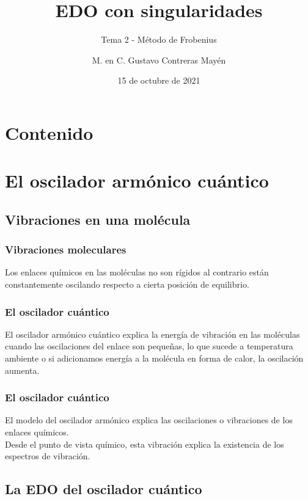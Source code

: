 \documentclass[12pt]{beamer}
\date{15 de octubre de 2021}
\title{\large{EDO con singularidades}}
\subtitle{Tema 2 - Método de Frobenius}
\author{M. en C. Gustavo Contreras Mayén}
\begin{document}
\maketitle
\fontsize{14}{14}\selectfont
{}

\section*{Contenido}

\section{El oscilador armónico cuántico}
\subsection{Vibraciones en una molécula}

\begin{frame}
\frametitle{Vibraciones moleculares}
Los enlaces químicos en las moléculas no son rígidos al contrario están constantemente oscilando respecto a cierta posición de equilibrio.
\end{frame}
\begin{frame}
\frametitle{El oscilador cuántico}
El oscilador armónico cuántico explica la energía de vibración en las moléculas cuando las oscilaciones del enlace son pequeñas, lo que sucede a temperatura ambiente o si adicionamos energía a la molécula en forma de calor, la oscilación aumenta.
\end{frame}
\begin{frame}
\frametitle{El oscilador cuántico}
El modelo del oscilador armónico explica las oscilaciones o vibraciones de los enlaces químicos.
\\
\bigskip
\pause
Desde el punto de vista químico, esta vibración explica la existencia de los espectros de vibración.
\end{frame}

\subsection{La EDO del oscilador cuántico}
\end{document}
